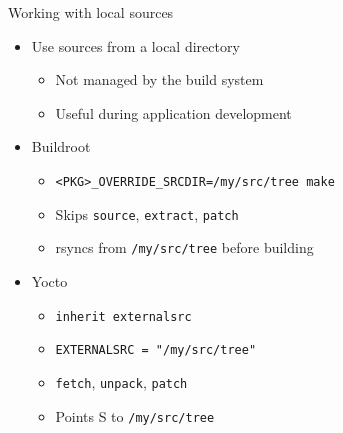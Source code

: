 \documentclass[xetex,table,aspectratio=169]{beamer}
\begin{document}
\begin{frame}{Working with local sources}
  \begin{itemize}
  \item Use sources from a local directory
    \begin{itemize}
    \item Not managed by the build system
    \item Useful during application development
    \end{itemize}
  \item Buildroot
    \begin{itemize}
    \item {\tt <PKG>\_OVERRIDE\_SRCDIR=/my/src/tree make}
    \item Skips {\tt source}, {\tt extract}, {\tt patch}
    \item rsyncs from {\tt /my/src/tree} before building
    \end{itemize}
  \item Yocto
    \begin{itemize}
    \item {\tt inherit externalsrc}
    \item {\tt EXTERNALSRC = "/my/src/tree"}
    \item {\tt fetch}, {\tt unpack}, {\tt patch}
    \item Points {S} to {\tt /my/src/tree}
    \end{itemize}
  \end{itemize}
\end{frame}
\end{document}
